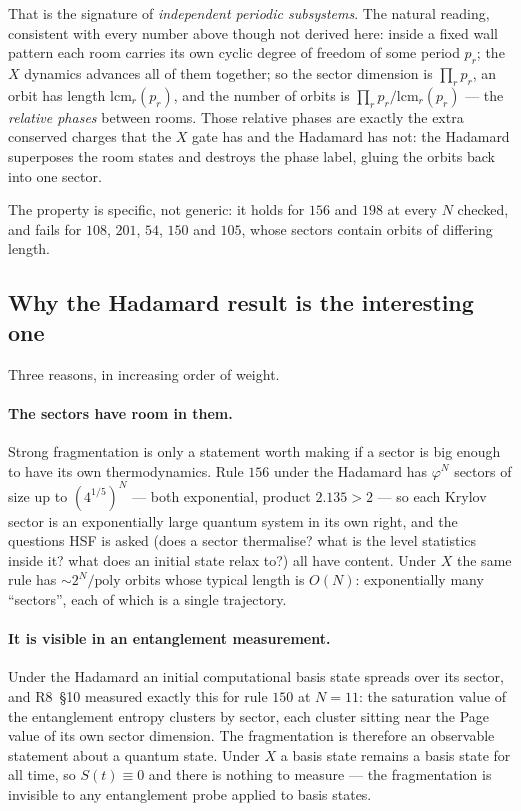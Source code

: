\documentclass[11pt]{article}
\theoremstyle{plain}
\theoremstyle{remark}
\begin{document}
That is the signature of \emph{independent periodic subsystems}. The natural
reading, consistent with every number above though not derived here: inside a
fixed wall pattern each room carries its own cyclic degree of freedom of some
period $p_r$; the $X$ dynamics advances all of them together; so the sector
dimension is $\prod_r p_r$, an orbit has length $\mathrm{lcm}_r(p_r)$, and the
number of orbits is $\prod_r p_r/\mathrm{lcm}_r(p_r)$ --- the \emph{relative
phases} between rooms. Those relative phases are exactly the extra conserved
charges that the $X$ gate has and the Hadamard has not: the Hadamard superposes
the room states and destroys the phase label, gluing the orbits back into one
sector.

The property is specific, not generic: it holds for $156$ and $198$ at every $N$
checked, and fails for $108$, $201$, $54$, $150$ and $105$, whose sectors contain
orbits of differing length.

\subsection{Why the Hadamard result is the interesting one}

Three reasons, in increasing order of weight.

\paragraph{The sectors have room in them.} Strong fragmentation is only a
statement worth making if a sector is big enough to have its own thermodynamics.
Rule $156$ under the Hadamard has $\varphi^N$ sectors of size up to
$(4^{1/5})^N$ --- both exponential, product $2.135>2$ --- so each Krylov sector is
an exponentially large quantum system in its own right, and the questions HSF is
asked (does a sector thermalise? what is the level statistics inside it? what does
an initial state relax to?) all have content. Under $X$ the same rule has
$\sim2^N/\mathrm{poly}$ orbits whose typical length is $O(N)$: exponentially many
``sectors'', each of which is a single trajectory.

\paragraph{It is visible in an entanglement measurement.} Under the Hadamard an
initial computational basis state spreads over its sector, and R8~\S10 measured
exactly this for rule $150$ at $N=11$: the saturation value of the entanglement
entropy clusters by sector, each cluster sitting near the Page value of its own
sector dimension. The fragmentation is therefore an observable statement about a
quantum state. Under $X$ a basis state remains a basis state for all time, so
$S(t)\equiv0$ and there is nothing to measure --- the fragmentation is invisible
to any entanglement probe applied to basis states.
\end{document}
